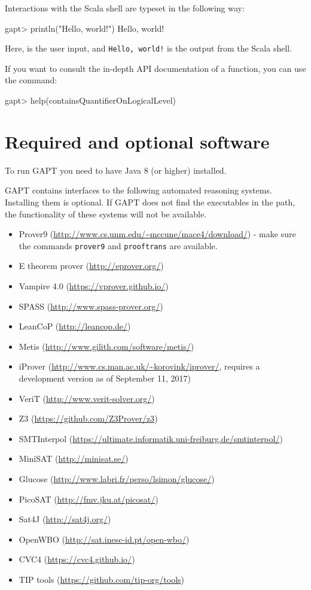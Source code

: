\documentclass[a4paper,11pt]{book}
\newcommand{\cli}[1]{{\ttfamily {#1}}}
\begin{document}
Interactions with the Scala shell are typeset in the following way:
\begin{clilisting}
gapt> println("Hello, world!")
Hello, world!

\end{clilisting}
Here, {\bfseries \cli{println("Hello, world!")}} is the user input, and \texttt{Hello,
  world!} is the output from the Scala shell.

If you want to consult the in-depth API documentation of a function, you can
use the \cli{help} command:
\begin{clilisting}
gapt> help(containsQuantifierOnLogicalLevel)

\end{clilisting}

\section{Required and optional software}
\label{sec:sysreq}

To run GAPT you need to have Java 8 (or higher) installed.

GAPT contains interfaces to the following automated reasoning systems. Installing
them is optional. If GAPT does not find the executables in the path, the
functionality of these systems will not be available.

\begin{itemize}
  \item Prover9 (\url{http://www.cs.unm.edu/~mccune/mace4/download/}) - make sure
        the commands \texttt{prover9} and \texttt{prooftrans} are available.
  \item E theorem prover (\url{http://eprover.org/})
  \item Vampire 4.0 (\url{https://vprover.github.io/})
  \item SPASS (\url{http://www.spass-prover.org/})
  \item LeanCoP (\url{http://leancop.de/})
  \item Metis (\url{http://www.gilith.com/software/metis/})
  \item iProver (\url{http://www.cs.man.ac.uk/~korovink/iprover/}, requires
        a development version as of September 11, 2017)
  \item VeriT (\url{http://www.verit-solver.org/})
  \item Z3 (\url{https://github.com/Z3Prover/z3})
  \item SMTInterpol (\url{https://ultimate.informatik.uni-freiburg.de/smtinterpol/})
  \item MiniSAT (\url{http://minisat.se/})
  \item Glucose (\url{http://www.labri.fr/perso/lsimon/glucose/})
  \item PicoSAT (\url{http://fmv.jku.at/picosat/})
  \item Sat4J (\url{http://sat4j.org/})
  \item OpenWBO (\url{http://sat.inesc-id.pt/open-wbo/})
  \item CVC4 (\url{https://cvc4.github.io/})
  \item TIP tools (\url{https://github.com/tip-org/tools})
\end{itemize}
\end{document}
